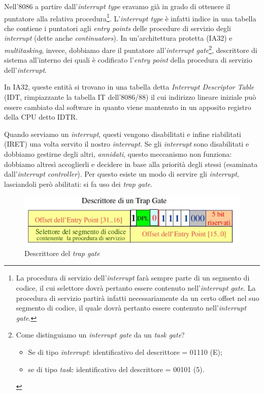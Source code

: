 Nell'8086 a partire dall'\textit{interrupt type} eravamo già in grado di ottenere il puntatore alla relativa procedura\footnote{La procedura di servizio dell'\textit{interrupt} farà sempre parte di un segmento di codice, il cui selettore dovrà pertanto essere contenuto nell'\textit{interrupt gate}. La procedura di servizio partirà infatti necessariamente da un certo offset nel suo segmento di codice, il quale dovrà pertanto essere contenuto nell'\textit{interrupt gate}.}. L'\textit{interrupt type} è infatti indice in una tabella che contiene i puntatori agli \textit{entry points} delle procedure di servizio degli \textit{interrupt} (dette anche \textit{continuators}). In un'architettura protetta (IA32) e \textit{multitasking}, invece, dobbiamo dare il puntatore all'\textit{interrupt gate}\footnote{Come distinguiamo un \textit{interrupt gate} da un \textit{task gate}?
\begin{itemize}
\item Se di tipo \textit{interrupt}: identificativo del descrittore = 01110 (E);
\item se di tipo \textit{task}: identificativo del descrittore = 00101 (5).
\end{itemize}
}, descrittore di sistema all'interno dei quali è codificato l'\textit{entry point} della procedura di servizio dell'\textit{interrupt}.

In IA32, queste entità si trovano in una tabella detta \textit{Interrupt Descriptor Table }(IDT, rimpiazzante la tabella IT dell'8086/88) il cui indirizzo lineare iniziale può essere cambiato dal software in quanto viene mantenuto in un apposito registro della CPU detto IDTR.

Quando serviamo un \textit{interrupt}, questi vengono disabilitati e infine riabilitati (IRET) una volta servito il nostro \textit{interrupt}. Se gli \textit{interrupt} sono disabilitati e dobbiamo gestirne degli altri, \emph{annidati}, questo meccanismo non funziona: dobbiamo altresì accoglierli e decidere in base alla priorità degli stessi (esaminata dall'\textit{interrupt controller}). Per questo esiste un modo di servire gli \textit{interrupt}, lasciandoli però abilitati: si fa uso dei \textit{trap gate}.

\begin{figure}[!h]
\centering
\includegraphics[width=0.65\columnwidth]{img/TrapGate}
\caption{Descrittore del \textit{trap gate}}
\label{fig:TrapGate}
\end{figure}

